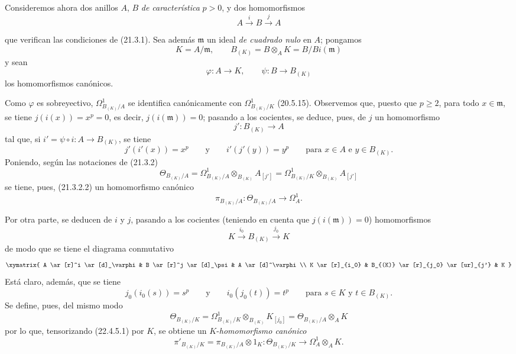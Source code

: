\begin{env}[22.4.5]
\label{0.22.4.5-fr}
Consideremos ahora dos anillos $A$, $B$ \emph{de característica} $p>0$, y
dos homomorfismos
\[
  A\xrightarrow{i}B\xrightarrow{j}A
\]


que verifican las condiciones de (21.3.1). Sea además $\mathfrak m$ un ideal
\emph{de cuadrado nulo} en $A$; pongamos
\[
  K=A/\mathfrak m,\qquad
  B_{(K)}=B\otimes_AK=B/Bi(\mathfrak m)
\]
y sean
\[
  \varphi:A\longrightarrow K,\qquad
  \psi:B\longrightarrow B_{(K)}
\]
los homomorfismos canónicos.

Como $\varphi$ es sobreyectivo, $\Omega^1_{B_{(K)}/A}$ se identifica
canónicamente con $\Omega^1_{B_{(K)}/K}$ (20.5.15). Observemos que, puesto que
$p\geqslant2$, para todo $x\in\mathfrak m$, se tiene $j(i(x))=x^p=0$, es decir,
$j(i(\mathfrak m))=0$; pasando a los cocientes, se deduce, pues, de $j$ un
homomorfismo
\[
  j':B_{(K)}\longrightarrow A
\]
tal que, si $i'=\psi\circ i:A\longrightarrow B_{(K)}$, se tiene
\[
  j'(i'(x))=x^p\qquad\text{y}\qquad i'(j'(y))=y^p
  \qquad\text{para }x\in A\text{ e }y\in B_{(K)}.
\]
Poniendo, según las notaciones de (21.3.2)
\[
  \Theta_{B_{(K)}/A}
  =\Omega^1_{B_{(K)}/A}\otimes_{B_{(K)}}A_{[j']}
  =\Omega^1_{B_{(K)}/K}\otimes_{B_{(K)}}A_{[j']}
\]
se tiene, pues, (21.3.2.2) un homomorfismo canónico
\begin{equation}
\label{0.22.4.5.1-fr}
  \pi_{B_{(K)}/A}:\Theta_{B_{(K)}/A}\longrightarrow\Omega^1_A.
  \tag{22.4.5.1}
\end{equation}

Por otra parte, se deducen de $i$ y $j$, pasando a los cocientes (teniendo en
cuenta que $j(i(\mathfrak m))=0$) homomorfismos
\[
  K\xrightarrow{i_0}B_{(K)}\xrightarrow{j_0}K
\]
de modo que se tiene el diagrama conmutativo
\[
  \xymatrix{
    A \ar[r]^i \ar[d]_\varphi & B \ar[r]^j \ar[d]_\psi & A \ar[d]^\varphi \\
    K \ar[r]_{i_0} & B_{(K)} \ar[r]_{j_0} \ar[ur]_{j'} & K
  }
\]
Está claro, además, que se tiene
\[
  j_0(i_0(s))=s^p\qquad\text{y}\qquad i_0(j_0(t))=t^p
  \qquad\text{para }s\in K\text{ y }t\in B_{(K)}.
\]
Se define, pues, del mismo modo
\[
  \Theta_{B_{(K)}/K}
  =\Omega^1_{B_{(K)}/K}\otimes_{B_{(K)}}K_{[j_0]}
  =\Theta_{B_{(K)}/A}\otimes_AK
\]
por lo que, tensorizando (22.4.5.1) por $K$, se obtiene un
$K$-\emph{homomorfismo canónico}
\begin{equation}
\label{0.22.4.5.2-fr}
  \pi'_{B_{(K)}/K}=\pi_{B_{(K)}/A}\otimes1_K:
  \Theta_{B_{(K)}/K}\longrightarrow\Omega^1_A\otimes_AK.
  \tag{22.4.5.2}
\end{equation}


\end{env}
